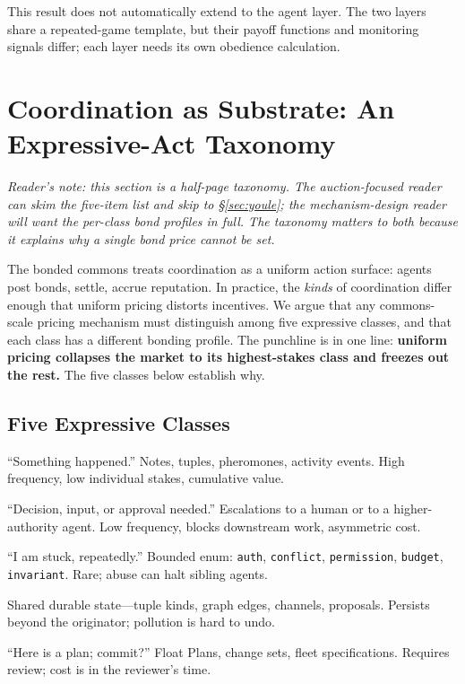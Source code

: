 \documentclass[11pt,a4paper]{article}
\theoremstyle{definition}
\theoremstyle{remark}
\begin{document}


This result does not automatically extend to the agent layer. The two layers share a repeated-game template, but their payoff functions and monitoring signals differ; each layer needs its own obedience calculation.

\pdexercisepointer{\ref{ex:bonded-a5-coverage-bound}}{\ref{ex:bonded-insurance-alt-pricing}}{\pageref{ex:bonded-a5-coverage-bound}}

\section{Coordination as Substrate: An Expressive-Act Taxonomy}\label{sec:taxonomy}

\noindent\emph{Reader's note: this section is a half-page taxonomy. The auction-focused reader can skim the five-item list and skip to \S\ref{sec:youle}; the mechanism-design reader will want the per-class bond profiles in full. The taxonomy matters to both because it explains why a single bond price cannot be set.}

\vspace{4pt}

The bonded commons treats coordination as a uniform action surface: agents post bonds, settle, accrue reputation. In practice, the \emph{kinds} of coordination differ enough that uniform pricing distorts incentives. We argue that any commons-scale pricing mechanism must distinguish among five expressive classes, and that each class has a different bonding profile. The punchline is in one line: \textbf{uniform pricing collapses the market to its highest-stakes class and freezes out the rest.} The five classes below establish why.

\subsection{Five Expressive Classes}

\begin{description}[nosep]
  \item[Signal.] ``Something happened.'' Notes, tuples, pheromones, activity events. High frequency, low individual stakes, cumulative value.
  \item[Request.] ``Decision, input, or approval needed.'' Escalations to a human or to a higher-authority agent. Low frequency, blocks downstream work, asymmetric cost.
  \item[Distress.] ``I am stuck, repeatedly.'' Bounded enum: \texttt{auth}, \texttt{conflict}, \texttt{permission}, \texttt{budget}, \texttt{invariant}. Rare; abuse can halt sibling agents.
  \item[Commons.] Shared durable state---tuple kinds, graph edges, channels, proposals. Persists beyond the originator; pollution is hard to undo.
  \item[Proposal.] ``Here is a plan; commit?'' Float Plans, change sets, fleet specifications. Requires review; cost is in the reviewer's time.
\end{description}
\end{document}

